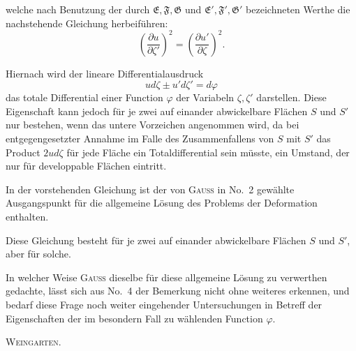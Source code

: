 %
\noindent welche nach Benutzung der durch $\mathfrak{E},\mathfrak{F},\mathfrak{G}$ und $\mathfrak{E}',\mathfrak{F}',\mathfrak{G}'$ bezeichneten Werthe die nachstehende Gleichung herbeiführen:
\[
\left(\frac{\partial u}{\partial\zeta'}\right)^2=\left(\frac{\partial u'}{\partial\zeta}\right)^2.
\]

\noindent Hiernach wird der lineare Differentialausdruck
\[
ud\zeta\pm u'd\zeta'=d\varphi
\]
\noindent das totale Differential einer Function $\varphi$ der Variabeln $\zeta,\zeta'$ darstellen. Diese Eigenschaft kann jedoch für je zwei auf einander abwickelbare Flächen $S$ und $S'$ nur bestehen, wenn das untere Vorzeichen angenommen wird, da bei entgegengesetzter Annahme im Falle des Zusammenfallens von $S$ mit $S'$ das Product $2ud\zeta$ für jede Fläche ein Totaldifferential sein müsste, ein Umstand, der nur für developpable Flächen eintritt.

In der vorstehenden Gleichung ist der von \textsc{Gauss} in No.\ 2 gewählte Ausgangspunkt für die allgemeine Lösung des Problems der Deformation enthalten.

Diese Gleichung besteht für je zwei auf einander abwickelbare Flächen $S$ und $S'$, aber  für solche.

In welcher Weise \textsc{Gauss} dieselbe für diese allgemeine Lösung zu verwerthen gedachte, lässt sich aus No.\ 4 der Bemerkung nicht ohne weiteres erkennen, und bedarf diese Frage noch weiter eingehender Untersuchungen in Betreff der Eigenschaften der im besondern Fall zu wählenden Function $\varphi$.
\begin{flushright}\textsc{Weingarten}.\end{flushright}

